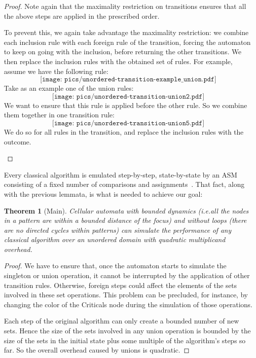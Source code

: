 \documentclass[submission,copyright,creativecommons,english]{eptcs}
\newtheorem{theorem}{Theorem}
\begin{document}
\begin{proof}
Note  again that the maximality restriction on transitions ensures that 
all the above steps are applied in the prescribed order.
\begin{ignore}
To prevent this, we  again take advantage the maximality restriction: 
we combine each inclusion rule with each foreign rule of the transition, forcing the automaton
to keep on going with the inclusion, before returning the other transitions. We then replace the inclusion rules with the obtained set of rules.
For example, assume we have the following rule:
\[\texttt{[image: pics/unordered-transition-example\_union.pdf]}\]
Take as an example one of the union rules:
\[\texttt{[image: pics/unordered-transition-union2.pdf]}\]
We want to ensure that this rule is applied before the other rule.
So we combine them together in one transition rule:
\[\texttt{[image: pics/unordered-transition-union5.pdf]}\]
We do so for all rules in the transition, and replace the inclusion rules with the outcome.
\end{ignore}
\end{proof}

Every classical algorithm is emulated step-by-step, state-by-state by an ASM
consisting of  a fixed number of comparisons and assignments~\cite{ASM-Theorem-Gurevich}.
That fact, along with the previous lemmata, is what is needed  to achieve our goal:

\begin{theorem}[Main]\label{th:main}
Cellular automata with {bounded dynamics (i.e.\@ all the nodes in a pattern are within a bounded distance of the focus) and without loops (there are no directed cycles within patterns)} can simulate the performance of  any classical algorithm over an unordered domain
with {quadratic} multiplicand overhead.
\end{theorem}

\begin{proof}
{We  have  to ensure that, once the automaton starts to simulate the singleton or union operation,
it cannot be interrupted by the application of other transition rules.
Otherwise, foreign steps could affect the elements of the sets involved in these set operations.
This problem can be precluded, for instance, by changing the color of the \textsf{Criticals} node during the
simulation of those operations.}

{Each step of the original algorithm can only create a bounded number of new sets.
Hence the size of the sets involved in any union operation is bounded by the size of the sets in  the initial state plus some multiple of the algorithm's steps so far.
So the overall overhead caused by unions is quadratic.}
\end{proof}
\end{document}
